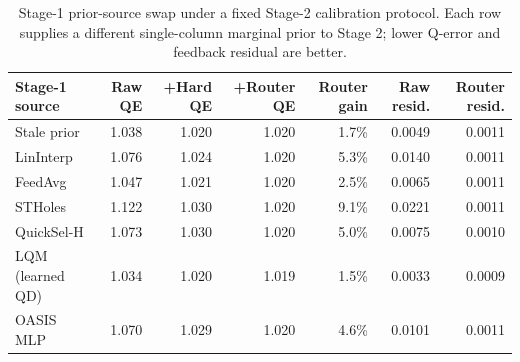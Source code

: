 \begin{table}[t]
  \centering
  \small
  \caption{Stage-1 prior-source swap under a fixed Stage-2 calibration protocol. Each row supplies a different single-column marginal prior to Stage 2; lower Q-error and feedback residual are better.}
  \label{tab:stage1_estimator_swap}
  \setlength{\tabcolsep}{4pt}
  \begin{tabular}{lrrrrrr}
    \toprule
    Stage-1 source & Raw QE & +Hard QE & +Router QE & Router gain & Raw resid. & Router resid. \\
    \midrule
    Stale prior & 1.038 & 1.020 & 1.020 & 1.7\% & 0.0049 & 0.0011 \\
    LinInterp & 1.076 & 1.024 & 1.020 & 5.3\% & 0.0140 & 0.0011 \\
    FeedAvg & 1.047 & 1.021 & 1.020 & 2.5\% & 0.0065 & 0.0011 \\
    STHoles & 1.122 & 1.030 & 1.020 & 9.1\% & 0.0221 & 0.0011 \\
    QuickSel-H & 1.073 & 1.030 & 1.020 & 5.0\% & 0.0075 & 0.0010 \\
    LQM (learned QD) & 1.034 & 1.020 & 1.019 & 1.5\% & 0.0033 & 0.0009 \\
    OASIS MLP & 1.070 & 1.029 & 1.020 & 4.6\% & 0.0101 & 0.0011 \\
    \bottomrule
  \end{tabular}
\end{table}
